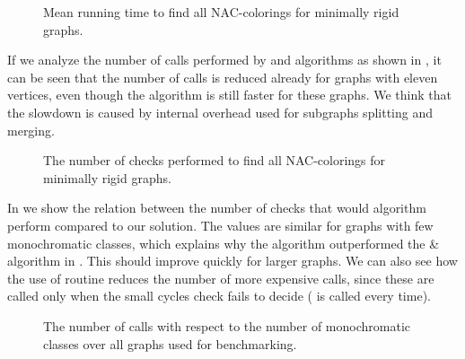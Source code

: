 \begin{figure}[ht]
	\centering
	\scalebox{\BenchFigureScale}{}
	\caption[Running time for minimally rigid graphs.]{
		Mean running time to find all NAC-colorings for minimally rigid graphs.}%
	\label{fig:graph_time_minimally_rigid}
\end{figure}%

If we analyze the number of \IsNACColoring{} calls performed by \NaiveCycles{} and \Subgraphs{} algorithms
as shown in ,
it can be seen that the number of \IsNACColoring{} calls is reduced already for graphs
with eleven vertices,
even though the \NaiveCycles{} algorithm is still faster for these graphs.
%
We think that the slowdown is caused by internal overhead
used for subgraphs splitting and merging.

\begin{figure}[ht]
	\centering
	\scalebox{\BenchFigureScale}{}
	\caption[Checks performed for minimally rigid graphs.]{
		The number of checks performed to find all NAC-colorings for minimally rigid graphs.}%
	\label{fig:graph_count_minimally_rigid}
\end{figure}%

In 
we show the relation between the number of \IsNACColoring{} checks that
would \Naive{} algorithm perform compared to our solution.
%
The values are similar for graphs with few monochromatic classes,
which explains why the \NaiveCycles{} algorithm outperformed
the \NeighborsDegree{}\&\MergeLinear{} algorithm in . This should improve quickly for larger graphs.
We can also see how the use of \CycleMask{} routine
reduces the number of more expensive \IsNACColoring{} calls,
since these are called only when the small cycles check \CycleMask{} fails to decide
(\CycleMask{} is called every time).

\begin{figure}[ht]
	\centering
	\scalebox{\BenchFigureScale}{}
	\caption[The number of \IsNACColoring{} calls.]{
		The number of \IsNACColoring{} calls with respect to the number of monochromatic classes
		over all graphs used for benchmarking.}%
	\label{fig:graph_summary}
\end{figure}%



